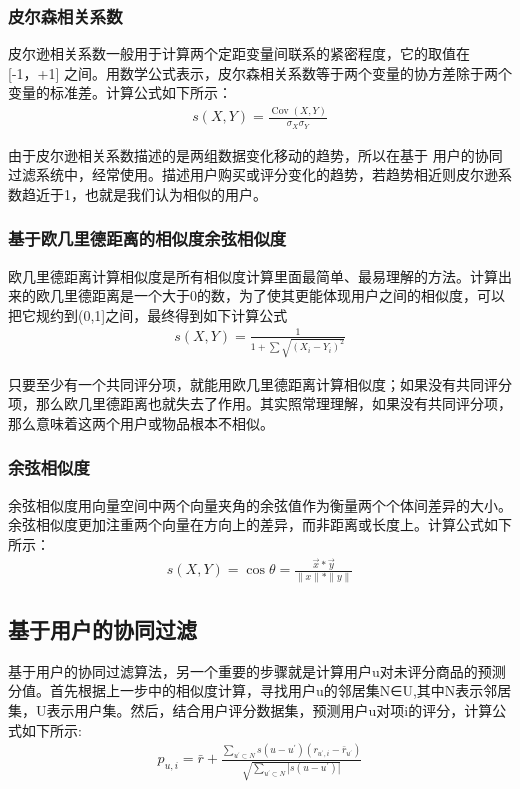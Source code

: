 \documentclass[withoutpreface,bwprint]{cumcmthesis} %
\begin{document}
\subsubsection{皮尔森相关系数}
皮尔逊相关系数一般用于计算两个定距变量间联系的紧密程度，它的取值在 [-1，+1] 之间。用数学公式表示，皮尔森相关系数等于两个变量的协方差除于两个变量的标准差。计算公式如下所示：
\begin{align}
	s(X, Y)=\frac{\operatorname{Cov}(X, Y)}{\sigma_{X} \sigma_{Y}}
\end{align}

由于皮尔逊相关系数描述的是两组数据变化移动的趋势，所以在基于 用户的协同过滤系统中，经常使用。描述用户购买或评分变化的趋势，若趋势相近则皮尔逊系数趋近于1，也就是我们认为相似的用户。
\subsubsection{基于欧几里德距离的相似度余弦相似度}
\par 欧几里德距离计算相似度是所有相似度计算里面最简单、最易理解的方法。计算出来的欧几里德距离是一个大于0的数，为了使其更能体现用户之间的相似度，可以把它规约到(0,1]之间，最终得到如下计算公式
\begin{align}
	s(X, Y)=\frac{1}{1+\sum \sqrt{\left(X_{i}-Y_{i}\right)^{2}}}
\end{align}
\par 只要至少有一个共同评分项，就能用欧几里德距离计算相似度；如果没有共同评分项，那么欧几里德距离也就失去了作用。其实照常理理解，如果没有共同评分项，那么意味着这两个用户或物品根本不相似。

\subsubsection{余弦相似度}
\par 余弦相似度用向量空间中两个向量夹角的余弦值作为衡量两个个体间差异的大小。余弦相似度更加注重两个向量在方向上的差异，而非距离或长度上。计算公式如下所示：
\begin{align}
s(X, Y)=\cos \theta=\frac{\vec{x} * \vec{y}}{\|x\| *\|y\|}
\end{align}

\subsection{基于用户的协同过滤}
\par 基于用户的协同过滤算法，另一个重要的步骤就是计算用户u对未评分商品的预测分值。首先根据上一步中的相似度计算，寻找用户u的邻居集N∈U,其中N表示邻居集，U表示用户集。然后，结合用户评分数据集，预测用户u对项i的评分，计算公式如下所示:
\begin{align}
p_{u, i}=\bar{r}+\frac{\sum_{u^{\prime} \subset N} s\left(u-u^{\prime}\right)\left(r_{u^{\prime}, i}-\bar{r}_{u^{\prime}}\right)}{\sqrt{\sum_{u^{\prime} \subset N}\left|s\left(u-u^{\prime}\right)\right|}}
\end{align}
\end{document}

